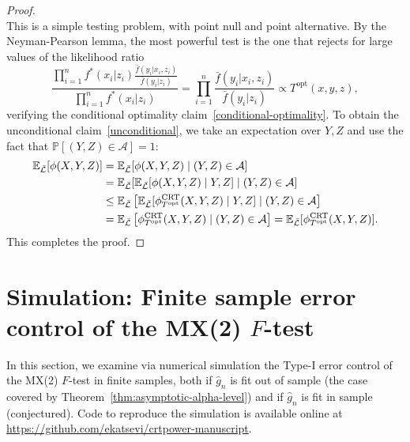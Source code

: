 \documentclass[ejs]{imsart}
\numberwithin{equation}{section}
\theoremstyle{plain}
\theoremstyle{definition}
\theoremstyle{remark}
\newcommand{\srx}{X}
\newcommand{\sfx}{x}
\newcommand{\srz}{Z}
\newcommand{\sfz}{z}
\newcommand{\sry}{Y}
\newcommand{\sfy}{y}
\def\CRT{\textnormal{CRT}}
\begin{document}
\begin{proof}
\begin{equation*}
	\end{equation*}
	This is a simple testing problem, with point null and point alternative. By the Neyman-Pearson lemma, the most powerful test is the one that rejects for large values of the likelihood ratio
	\begin{equation}
 \frac{\prod_{i = 1}^n f^*(\sfx_i|\sfz_i)\frac{\bar f(\sfy_i|\sfx_i, \sfz_i)}{\bar f(\sfy_i|\sfz_i)}}{\prod_{i = 1}^n f^*(\sfx_i|\sfz_i)} = \prod_{i = 1}^n \frac{\bar f(\sfy_i|\sfx_i, \sfz_i)}{\bar f(\sfy_i|\sfz_i)} \propto T^{\text{opt}}(\sfx, \sfy, \sfz),
	\label{eq:likelihood-ratio-derivation}
	\end{equation}
	verifying the conditional optimality claim~\eqref{conditional-optimality}. To obtain the unconditional claim~\eqref{unconditional}, we take an expectation over $\sry, \srz$ and use the fact that $\mathbb P[(\sry, \srz) \in \mathcal A] = 1$:
	\begin{equation*}
		\begin{split}
			\mathbb E_{\bar{\mathcal L}}[\phi(\srx,\sry,\srz)] &= \mathbb E_{\bar{\mathcal L}}[\phi(\srx,\sry,\srz) \mid (\sry, \srz) \in \mathcal A] \\
			&= \mathbb E_{\bar{\mathcal L}}[\mathbb E_{\bar{\mathcal L}}[\phi(\srx,\sry,\srz) \mid \sry,\srz] \mid (\sry, \srz) \in \mathcal A] \\
			&\leq \mathbb E_{\bar{\mathcal L}}\left[\mathbb E_{\bar{\mathcal L}}[\phi^{\CRT}_{T^\textnormal{opt}}(\srx,\sry,\srz)\mid\sry,\srz] \mid (\sry, \srz) \in \mathcal A\right] \\
			&= \mathbb E_{\bar{\mathcal L}}\left[\phi^{\CRT}_{T^\textnormal{opt}}(\srx,\sry,\srz) \mid (\sry, \srz) \in \mathcal A\right] = \mathbb E_{\bar{\mathcal L}}[\phi^{\CRT}_{T^\textnormal{opt}}(\srx, \sry, \srz)].
		\end{split}	
	\end{equation*}
This completes the proof.
\end{proof}

\section{Simulation: Finite sample error control of the MX(2) $F$-test}  \label{sec:simulations}

In this section, we examine via numerical simulation the Type-I error control of the MX(2) $F$-test in finite samples, both if $\widehat g_n$ is fit out of sample (the case covered by Theorem~\ref{thm:asymptotic-alpha-level}) and if $\widehat g_n$ is fit in sample (conjectured). Code to reproduce the simulation is available online at \url{https://github.com/ekatsevi/crtpower-manuscript}.
\end{document}
